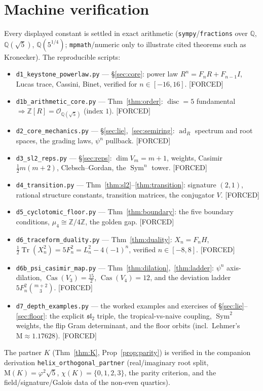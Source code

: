 \documentclass[11pt]{article}
\newcommand{\OK}{𝒪}
\theoremstyle{plain}
\theoremstyle{definition}
\theoremstyle{remark}
\newcommand{\Forced}{\textcolor{forcedc}{[FORCED]}}
\newcommand{\Tr}{\operatorname{Tr}}
\newcommand{\Mah}{\mathrm{M}}
\newcommand{\ad}{\operatorname{ad}}
\begin{document}
\section{Machine verification}\label{app:verify}
Every displayed constant is settled in exact arithmetic (\texttt{sympy}/\texttt{fractions} over $ℚ$, $ℚ(\sqrt5)$, $ℚ(5^{1/4})$; \texttt{mpmath}/numeric only to illustrate cited theorems such as Kronecker). The reproducible scripts:
\begin{itemize}[leftmargin=1.4em,itemsep=1pt]
\item \texttt{d1\_keystone\_powerlaw.py} --- §\ref{sec:core}: power law $R^{n}=F_nR+F_{n-1}I$, Lucas trace, Cassini, Binet, verified for $n∈[-16,16]$. \Forced
\item \texttt{d1b\_arithmetic\_core.py} --- Thm~\ref{thm:order}: $\operatorname{disc}=5$ fundamental $⇒ ℤ[R]=\OK_{ℚ(\sqrt5)}$ (index $1$). \Forced
\item \texttt{d2\_core\_mechanics.py} --- §\ref{sec:lie},~\ref{sec:semiring}: $\ad_R$ spectrum and root spaces, the grading laws, $ψ^{n}$ pullback. \Forced
\item \texttt{d3\_sl2\_reps.py} --- §\ref{sec:reps}: $\dim V_m=m+1$, weights, Casimir $\tfrac12 m(m+2)$, Clebsch--Gordan, the $\operatorname{Sym}^n$ tower. \Forced
\item \texttt{d4\_transition.py} --- Thm~\ref{thm:sl2}--\ref{thm:transition}: signature $(2,1)$, rational structure constants, transition matrices, the conjugator $V$. \Forced
\item \texttt{d5\_cyclotomic\_floor.py} --- Thm~\ref{thm:boundary}: the five boundary conditions, $μ_4≅ℤ/4ℤ$, the golden gap. \Forced
\item \texttt{d6\_traceform\_duality.py} --- Thm~\ref{thm:duality}: $X_n=F_nH$, $\tfrac12\Tr(X_n^{2})=5F_n^{2}=L_n^{2}-4(-1)^{n}$, verified $n∈[-8,8]$. \Forced
\item \texttt{d6b\_psi\_casimir\_map.py} --- Thm~\ref{thm:dilation},~\ref{thm:ladder}: $ψ^{n}$ axis-dilation, $\operatorname{Cas}(V_3)=\tfrac{15}{2}$, $\operatorname{Cas}(V_4)=12$, and the deviation ladder $5F_n^{2}\binom{m+2}{3}$. \Forced
\item \texttt{d7\_depth\_examples.py} --- the worked examples and exercises of §\ref{sec:lie}--\ref{sec:floor}: the explicit $𝔰𝔩_2$ triple, the tropical-vs-naive coupling, $\operatorname{Sym}^{2}$ weights, the flip Gram determinant, and the floor orbits (incl.\ Lehmer's $\Mah≈1.17628$). \Forced
\end{itemize}
The partner $K$ (Thm~\ref{thm:K}, Prop~\ref{prop:parity}) is verified in the companion derivation \texttt{helix\_orthogonal\_partner} (real/imaginary root split, $\Mah(K)=φ^{2}\sqrt5$, $χ(K)=\{0,1,2,3\}$, the parity criterion, and the field/signature/Galois data of the non-even quartics).
\end{document}
